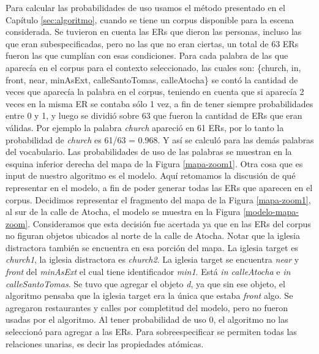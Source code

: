 Para calcular las probabilidades de uso usamos el m\'etodo presentado en el Cap\'itulo \ref{sec:algoritmo}, cuando se tiene un corpus disponible para la escena considerada. Se tuvieron en cuenta las ERs que dieron las personas, incluso las que eran subespecificadas, pero no las que no eran ciertas, un total de 63 ERs fueron las que cumpl\'ian con esas condiciones. Para cada palabra de las que aparec\'ia en el corpus para el contexto seleccionado, las cuales son: \{church, in, front, near, minAsExt, calleSantoTomas, calleAtocha\} se cont\'o la cantidad de veces que aparec\'ia la palabra en el corpus, teniendo en cuenta que si aparec\'ia 2 veces en la misma ER se contaba s\'olo 1 vez, a fin de tener siempre probabilidades entre 0 y 1, y luego se dividi\'o sobre 63 que fueron la cantidad de ERs que eran v\'alidas. Por ejemplo la palabra {\it church} apareci\'o en 61 ERs, por lo tanto la probabilidad de {\it church} es 61/63 = 0.968. Y as\'i se calcul\'o para las dem\'as palabras del vocabulario. Las probabilidades de uso de las palabras se muestran en la esquina inferior derecha del mapa de la Figura \ref{mapa-zoom1}.
Otra cosa que es input de nuestro algoritmo es el modelo. Aqu\'i retomamos la discusi\'on de qu\'e representar en el modelo, a fin de poder generar todas las ERs que aparecen en el corpus. Decidimos representar el fragmento del mapa de la Figura \ref{mapa-zoom1}, al sur de la calle de Atocha, el modelo se muestra en la Figura \ref{modelo-mapa-zoom}. Consideramos que esta decisi\'on fue acertada ya que en las ERs del corpus no figuran objetos ubicados al norte de la calle de Atocha. Notar que la iglesia distractora tambi\'en se encuentra en esa porci\'on del mapa. La iglesia target es {\it church1}, la iglesia distractora es {\it church2}. La iglesia target se encuentra {\it near} y {\it front} del {\it minAsExt} el cual tiene identificador {\it min1}. Est\'a {\it in calleAtocha} e {\it in calleSantoTomas}. Se tuvo que agregar el objeto {\it d}, ya que sin ese objeto, el algoritmo pensaba que la iglesia target era la \'unica que estaba {\it front} algo. Se agregaron restaurantes y calles por completitud del modelo, pero no fueron usadas por el algoritmo. Al tener probabilidad de uso 0, el algoritmo no las seleccion\'o para agregar a las ERs. Para sobreespecificar se permiten todas las relaciones unarias, es decir las propiedades at\'omicas.\\

